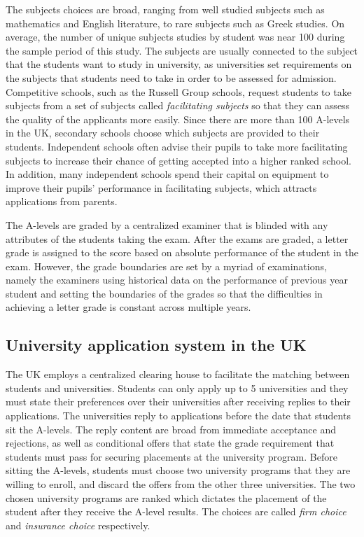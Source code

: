 The subjects choices are broad, ranging from well studied subjects such as mathematics and English literature, to rare subjects such as Greek studies. On average, the number of unique subjects studies by student was near 100 during the sample period of this study. The subjects are usually connected to the subject that the students want to study in university, as universities set requirements on the subjects that students need to take in order to be assessed for admission. Competitive schools, such as the Russell Group schools, request students to take subjects from a set of subjects called \emph{facilitating subjects} so that they can assess the quality of the applicants more easily.  Since there are more than 100 A-levels in the UK, secondary schools choose which subjects are provided to their students. Independent schools often advise their pupils to take more facilitating subjects to increase their chance of getting accepted into a higher ranked school. In addition, many independent schools spend their capital on equipment to improve their pupils' performance in facilitating subjects, which attracts applications from parents. 

The A-levels are graded by a centralized examiner that is blinded with any attributes of the students taking the exam. After the exams are graded, a letter grade is assigned to the score based on absolute performance of the student in the exam. However, the grade boundaries are set by a myriad of examinations, namely the examiners using historical data on the performance of previous year student and setting the boundaries of the grades so that the difficulties in achieving a letter grade is constant across multiple years. 

\subsection{University application system in the UK}
The UK employs a centralized clearing house to facilitate the matching between students and universities. Students can only apply up to 5 universities and they must state their preferences over their universities after receiving replies to their applications. The universities reply to applications before the date that students sit the A-levels. The reply content are broad from immediate acceptance and rejections, as well as conditional offers that state the grade requirement that students must pass for securing placements at the university program. Before sitting the A-levels, students must choose two university programs that they are willing to enroll, and discard the offers from the other three universities. The two chosen university programs are ranked which dictates the placement of the student after they receive the A-level results. The choices are called \emph{firm choice} and \emph{insurance choice} respectively. 


